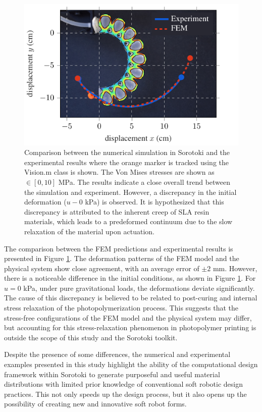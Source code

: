\begin{figure}[!t]
    \centering
    \includegraphics*[width=.8\textwidth]{./pdf/thesis-figure-6-25.pdf}
    \caption{Comparison between the numerical simulation in Sorotoki and the experimental results where the orange marker is tracked using the Vision.m class is shown. The Von Mises stresses are shown as \protect{}$\!\!\in [0,10]$ \si{\mega \pascal}. The results indicate a close overall trend between the simulation and experiment. However, a discrepancy in the initial deformation ($u - 0$ kPa) is observed. It is hypothesized that this discrepancy is attributed to the inherent creep of SLA resin materials, which leads to a predeformed continuum due to the slow relaxation of the material upon actuation. }
    \label{fig:C5:fig_optpneunet_exp_compare}
\end{figure}

The comparison between the FEM predictions and experimental results is presented in Figure \ref{fig:C5:fig_optpneunet_exp_compare}. The deformation patterns of the FEM model and the physical system show close agreement, with an average error of $\pm 2$ \si{\milli \meter}. However, there is a noticeable difference in the initial conditions, as shown in Figure \ref{fig:C5:fig_optpneunet_exp_compare}. For $u = 0$ \si{\kilo \pascal}, under pure gravitational loads, the deformations deviate significantly. The cause of this discrepancy is believed to be related to post-curing and internal stress relaxation of the photopolymerization process. This suggests that the stress-free configurations of the FEM model and the physical system may differ, but accounting for this stress-relaxation phenomenon in photopolymer printing is outside the scope of this study and the Sorotoki toolkit.

Despite the presence of some differences, the numerical and experimental examples presented in this study highlight the ability of the computational design framework within Sorotoki to generate purposeful and useful material distributions with limited prior knowledge of conventional soft robotic design practices. This not only speeds up the design process, but it also opens up the possibility of creating new and innovative soft robot forms.

